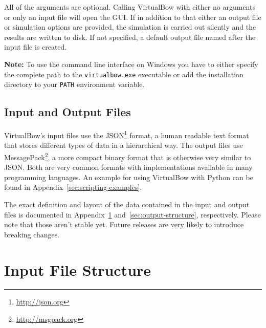 \documentclass[12pt]{article}
\begin{document}
\smallskip

All of the arguments are optional.
Calling VirtualBow with either no arguments or only an input file will open the GUI.
If in addition to that either an output file or simulation options are provided, the simulation is carried out silently and the results are written to disk.
If not specified, a default output file named after the input file is created.

\textbf{Note:} To use the command line interface on Windows you have to either specify the complete path to the \texttt{virtualbow.exe} executable or add the installation directory to your \texttt{PATH} environment variable.

\subsection*{Input and Output Files}

VirtualBow's input files use the JSON\footnote{\url{http://json.org}} format, a human readable text format that stores different types of data in a hierarchical way.
The output files use MessagePack\footnote{\url{http://msgpack.org}}, a more compact binary format that is otherwise very similar to JSON.
Both are very common formats with implementations available in many programming languages.
An example for using VirtualBow with Python can be found in Appendix~\ref{sec:scripting-examples}.

The exact definition and layout of the data contained in the input and output files is documented in Appendix~\ref{sec:input-structure} and~\ref{sec:output-structure}, respectively. Please note that those aren't stable yet. Future releases are very likely to introduce breaking changes.

\appendix

\newpage
\section{Input File Structure}
\label{sec:input-structure}

\newcommand{\tablespace}{\rule{0pt}{3ex}}
\end{document}
